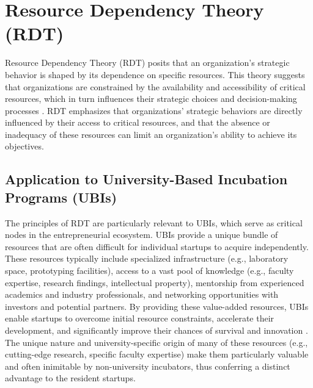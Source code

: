 \documentclass[../Main.tex]{subfiles}
\begin{document}
\section{Resource Dependency Theory (RDT)}
Resource Dependency Theory (RDT) posits that an organization's strategic behavior is shaped by its dependence on specific resources. This theory suggests that organizations are constrained by the availability and accessibility of critical resources, which in turn influences their strategic choices and decision-making processes \cite{pfeffer1978external}. RDT emphasizes that organizations' strategic behaviors are directly influenced by their access to critical resources, and that the absence or inadequacy of these resources can limit an organization's ability to achieve its objectives.

\subsection{Application to University-Based Incubation Programs (UBIs)}
The principles of RDT are particularly relevant to UBIs, which serve as critical nodes in the entrepreneurial ecosystem. UBIs provide a unique bundle of resources that are often difficult for individual startups to acquire independently. These resources typically include specialized infrastructure (e.g., laboratory space, prototyping facilities), access to a vast pool of knowledge (e.g., faculty expertise, research findings, intellectual property), mentorship from experienced academics and industry professionals, and networking opportunities with investors and potential partners. By providing these value-added resources, UBIs enable startups to overcome initial resource constraints, accelerate their development, and significantly improve their chances of survival and innovation \cite{mian1996assessing}. The unique nature and university-specific origin of many of these resources (e.g., cutting-edge research, specific faculty expertise) make them particularly valuable and often inimitable by non-university incubators, thus conferring a distinct advantage to the resident startups.
\end{document}
